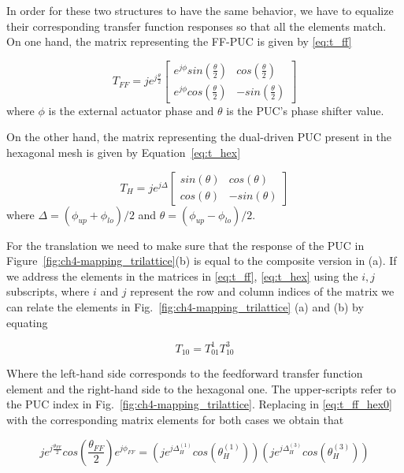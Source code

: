 In order for these two structures to have the same behavior, we have to equalize their corresponding transfer function responses so that all the elements match.
On one hand, the matrix representing the FF-PUC is given by \eqref{eq:t_ff}

\begin{equation}
	\label{eq:t_ff}
	T_{FF} = je^{j\frac{\theta}{2}}
	\begin{bmatrix}
		e^{j\phi} sin(\frac{\theta}{2}) & cos(\frac{\theta}{2})  \\
		e^{j\phi} cos(\frac{\theta}{2}) & -sin(\frac{\theta}{2})
	\end{bmatrix}
\end{equation}
where $\phi$ is the external actuator phase and $\theta$ is the PUC's phase shifter value.

On the other hand, the matrix representing the dual-driven PUC present in the hexagonal mesh is given by Equation~\eqref{eq:t_hex}

\begin{equation}
	\label{eq:t_hex}
	T_{H} = je^{j\Delta}
	\begin{bmatrix}
		sin(\theta) & cos(\theta)  \\
		cos(\theta) & -sin(\theta)
	\end{bmatrix}
\end{equation}
where $\Delta = (\phi_{up} + \phi_{lo})/2$ and $\theta = (\phi_{up} - \phi_{lo})/2$.

For the translation we need to make sure that the response of the PUC in Figure~\ref{fig:ch4-mapping_trilattice}(b) is equal to the composite version in (a).
If we address the elements in the matrices in \eqref{eq:t_ff}, \eqref{eq:t_hex} using the $i,j$ subscripts, where
$i$ and $j$ represent the row and column indices of the matrix we can relate the elements in Fig.~\ref{fig:ch4-mapping_trilattice} (a) and (b) by equating

\begin{equation}
	\label{eq:t_ff_hex0}
	T_{10} = T^{1}_{01}T^{3}_{10} \end{equation}

Where the left-hand side corresponds to the feedforward transfer function element and the right-hand side to the hexagonal one.
The upper-scripts refer to the PUC index in Fig.~\ref{fig:ch4-mapping_trilattice}.
Replacing in \eqref{eq:t_ff_hex0} with the corresponding matrix elements for both cases we obtain that

\begin{equation}
	\label{eq:t_ff_hex1}
	je^{j\frac{\theta_{FF}}{2}}cos(\frac{\theta_{FF}}{2})e^{j\phi_{FF}} = (je^{j\Delta^{(1)}_{H}}cos(\theta^{(1)}_{H}))(je^{j\Delta^{(3)}_{H}}cos(\theta^{(3)}_{H}))
\end{equation}

